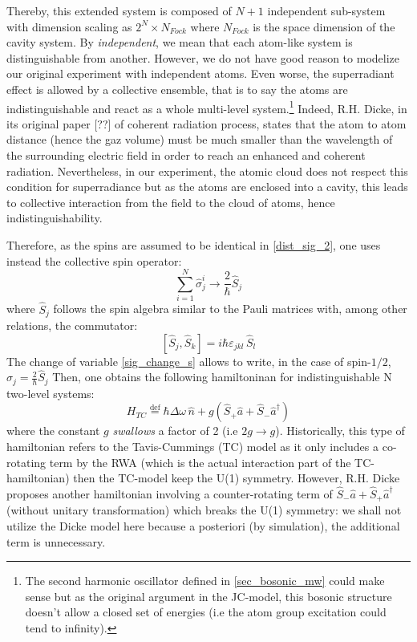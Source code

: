 \documentclass[12pt]{report}
\begin{document}
Thereby, this extended system is composed of $N+1$ independent sub-system with dimension scaling as $2^N \times N_{Fock}$ where $N_{Fock}$ is the space dimension of the cavity system. By \textit{independent}, we mean that each atom-like system is distinguishable from another. However, we do not have good reason to modelize our original experiment with independent atoms. Even worse, the superradiant effect is allowed by a collective ensemble, that is to say the atoms are indistinguishable and react as a whole multi-level system.\footnote{The second harmonic oscillator defined in \eqref{sec_bosonic_mw} could make sense but as the original argument in the JC-model, this bosonic structure doesn't allow a closed set of energies (i.e the atom group excitation could tend to infinity).} Indeed, R.H. Dicke, in its original paper [??] of coherent radiation process, states that the atom to atom distance (hence the gaz volume) must be much smaller than the wavelength of the surrounding electric field in order to reach an enhanced and coherent radiation. Nevertheless, in our experiment, the atomic cloud does not respect this condition for superradiance but as the atoms are enclosed into a cavity, this leads to collective interaction from the field to the cloud of atoms, hence indistinguishability.

Therefore, as the spins are assumed to be identical in \eqref{dist_sig_2}, one uses instead the collective spin operator:
\begin{equation}
\label{sig_change_s}
\sum_{i=1}^{N} \hat{\sigma}_j^i \rightarrow \frac{2}{\hbar} \hat{S}_j
\end{equation}
where $\hat{S}_j$ follows the spin algebra similar to the Pauli matrices with, among other relations, the commutator:
\begin{equation}
{\displaystyle [\hat{S} _{j},\hat{S} _{k}]=i\hbar\varepsilon _{jkl}\,\hat{S} _{l}}
\end{equation}
The change of variable \eqref{sig_change_s} allows to write, in the case of spin-$1/2$, $\hat{\sigma}_j = \frac{2}{\hbar}\hat{S}_j$ Then, one obtains the following hamiltoninan for indistinguishable N two-level systems:
\begin{equation}
H_{TC} \stackrel{\text{def}}{=} \hbar\Delta\omega\,\hat{n} + g \left(\hat{S}_+ \hat{a} + \hat{S}_-\hat{a}^{\dag} \right)
\end{equation}
where the constant $g$ \textit{swallows} a factor of 2 (i.e $2g \rightarrow g$). Historically, this type of hamiltonian refers to the Tavis-Cummings (TC) model as it only includes a co-rotating term by the RWA (which is the actual interaction part of the TC-hamiltonian) then the TC-model keep the U(1) symmetry. However, R.H. Dicke proposes another hamiltonian involving a counter-rotating term of $\hat{S}_- \hat{a} + \hat{S}_+\hat{a}^{\dag}$ (without unitary transformation) which breaks the U(1) symmetry: we shall not utilize the Dicke model here because a posteriori (by simulation), the additional term is unnecessary.
\end{document}
